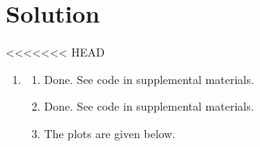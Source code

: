 \documentclass[submit]{../harvardml}
\newenvironment{solution}
  {\color{blue}\section*{Solution}}
{}
\begin{document}
\begin{solution}
<<<<<<< HEAD
    \begin{enumerate}
        \item 
        \begin{enumerate}
            \item Done. See code in supplemental materials.
            \item Done. See code in supplemental materials.
            \item The plots are given below.
            \begin{figure}[htbp]
              \centering
              \hfill
              \\
\end{figure}
\end{enumerate}
\end{enumerate}
\end{solution}
\end{document}
